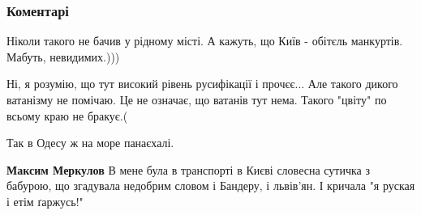  
 
 
 
 
\subsubsection{Коментарі}
\label{sec:27_07_2021.fb.bryhar_sergej.1.lajno.cmt}

\begin{itemize}
 
Ніколи такого не бачив у рідному місті. А кажуть, що Київ - обітєль манкуртів. Мабуть, невидимих.)))
\begin{itemize}
 
Ні, я розумію, що тут високий рівень русифікації і прочєє... Але такого дикого
ватанізму не помічаю. Це не означає, що ватанів тут нема. Такого "цвіту" по
всьому краю не бракує.(

 
Так в Одесу ж на море панаєхалі.

 
\textbf{Максим Меркулов} В мене була в транспорті в Києві словесна сутичка з бабурою, що згадувала недобрим словом і Бандеру, і львів'ян. І кричала "я руская і етім ґаржусь!"
\end{itemize}


\end{itemize}
